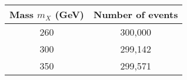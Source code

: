 \begin{tabular}{|c|c|}
\hline
Mass $m_X$ (GeV) & Number of events \\ \hline
260 & 300,000\\
300 & 299,142\\
350 & 299,571\\
\hline
\end{tabular}

